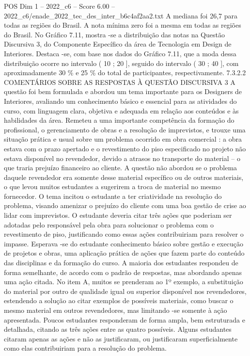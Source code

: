 \begin{textsample}{POS Dim 1 – 2022\_c6 – Score 6.00 – 2022\_c6/enade\_2022\_tec\_des\_inter\_b6c4af2aa2.txt}
A mediana foi 26,7 para todas as regiões do Brasil.
A nota mínima zero foi a mesma em todas as regiões do Brasil.
No Gráfico 7.11, mostra -se a distribuição das notas na Questão Discursiva 3, do Componente Específico da área de Tecnologia em Design de Interiores.
Destaca -se, com base nos dados do Gráfico 7.11, que a moda dessa distribuição ocorre no intervalo ( 10 ; 20 ], seguido do intervalo ( 30 ; 40 ], com aproximadamente 30 \% e 25 \% do total de participantes, respectivamente. 7.3.2.2 COMENTÁRIOS SOBRE AS RESPOSTAS À QUESTÃO DISCURSIVA 3 A questão foi bem formulada e abordou um tema importante para os Designers de Interiores, avaliando um conhecimento básico e essencial para as atividades do curso, com linguagem clara, objetiva e adequada em relação aos conteúdos e às habilidades da área.
Remeteu a uma importante competência da formação do profissional, o gerenciamento de obras e a resolução de imprevistos, e trouxe uma situação prática e usual sobre um problema ocorrido em obra comercial : a obra estava com o prazo apertado e o revestimento do piso especificado no projeto não estava disponível no revendedor, devido a atrasos no transporte do material – o que traria prejuízo financeiro ao cliente.
A questão não abordou se o problema daquele revendedor era somente desse material específico ou de outros materiais, o que levou muitos estudantes a sugerirem a troca de material no mesmo fornecedor.
O tema incitou o estudante a ter criatividade na resolução do problema, visando amenizar o prejuízo do cliente com uma boa gestão de crise ao lidar com imprevistos.
O estudante deveria citar três ações que poderiam ser adotadas pelo responsável pela obra para solucionar o problema com o revestimento de piso, justificando como essas ações contribuiriam para resolver o impasse.
Esperava -se do estudante conhecimento básico sobre gestão e execução de projetos e obras, uma aplicação prática de ações que fazem parte do conteúdo das disciplinas e da formação do curso.
A maioria dos estudantes respondeu de forma semelhante, de acordo com o padrão de respostas, mas abordando apenas uma ação citada.
No item A, muitos se prenderam ao 1º exemplo, a substituição do material por outro de qualidade igual ou superior disponível nos revendedores, estendendo a solução ao citar exemplos de possíveis materiais, como buscar o mesmo material em outros revendedores, mas limitando -se somente à ação apresentada.
Poucos estudantes responderam de forma ampla, bem estruturada e detalhada, citando as três ações entre as quatro possíveis.
Alguns estudantes citaram apenas as ações e não as justificaram, ou justificaram superficialmente como elas contribuiriam para a resolução do problema.

\end{textsample}
